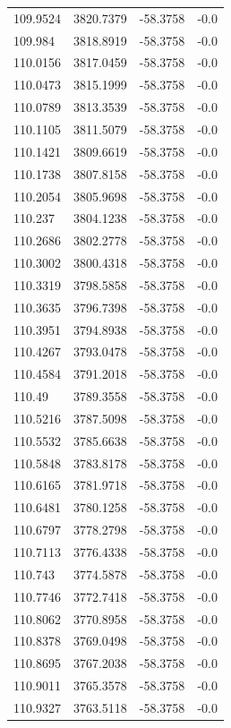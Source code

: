 \begin{table}[H]
\begin{tabular}{llll}
109.9524 & 3820.7379 & -58.3758 & -0.0 \\
109.984 & 3818.8919 & -58.3758 & -0.0 \\
110.0156 & 3817.0459 & -58.3758 & -0.0 \\
110.0473 & 3815.1999 & -58.3758 & -0.0 \\
110.0789 & 3813.3539 & -58.3758 & -0.0 \\
110.1105 & 3811.5079 & -58.3758 & -0.0 \\
110.1421 & 3809.6619 & -58.3758 & -0.0 \\
110.1738 & 3807.8158 & -58.3758 & -0.0 \\
110.2054 & 3805.9698 & -58.3758 & -0.0 \\
110.237 & 3804.1238 & -58.3758 & -0.0 \\
110.2686 & 3802.2778 & -58.3758 & -0.0 \\
110.3002 & 3800.4318 & -58.3758 & -0.0 \\
110.3319 & 3798.5858 & -58.3758 & -0.0 \\
110.3635 & 3796.7398 & -58.3758 & -0.0 \\
110.3951 & 3794.8938 & -58.3758 & -0.0 \\
110.4267 & 3793.0478 & -58.3758 & -0.0 \\
110.4584 & 3791.2018 & -58.3758 & -0.0 \\
110.49 & 3789.3558 & -58.3758 & -0.0 \\
110.5216 & 3787.5098 & -58.3758 & -0.0 \\
110.5532 & 3785.6638 & -58.3758 & -0.0 \\
110.5848 & 3783.8178 & -58.3758 & -0.0 \\
110.6165 & 3781.9718 & -58.3758 & -0.0 \\
110.6481 & 3780.1258 & -58.3758 & -0.0 \\
110.6797 & 3778.2798 & -58.3758 & -0.0 \\
110.7113 & 3776.4338 & -58.3758 & -0.0 \\
110.743 & 3774.5878 & -58.3758 & -0.0 \\
110.7746 & 3772.7418 & -58.3758 & -0.0 \\
110.8062 & 3770.8958 & -58.3758 & -0.0 \\
110.8378 & 3769.0498 & -58.3758 & -0.0 \\
110.8695 & 3767.2038 & -58.3758 & -0.0 \\
110.9011 & 3765.3578 & -58.3758 & -0.0 \\
110.9327 & 3763.5118 & -58.3758 & -0.0 \\

\end{tabular}
\end{table}
